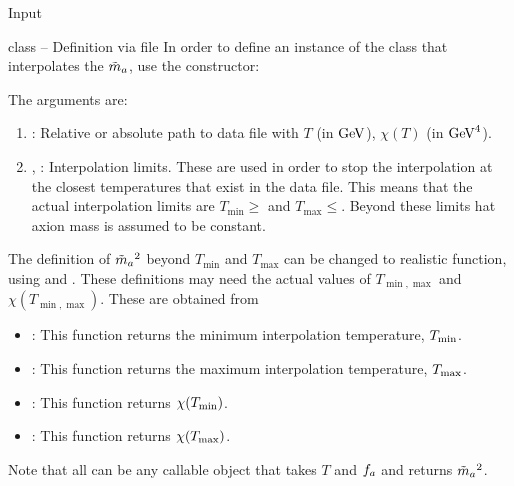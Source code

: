 \documentclass[10pt,utf8,compress,xcolor=dvipsnames]{beamer}
\begin{document}

\begin{frame}[noframenumbering]
	\begin{center}
		{\color{yellow} \Huge \CPP  Input}
	\end{center}
\end{frame}
%


\begin{frame}{ class -- Definition via file}
	\fontB
	In order to define an instance of the  class that interpolates the $\tilde m_{a}{}$, use the constructor:
	\lstset{language = c++}
	
	The arguments are:
	\begin{enumerate}
		\item {}: Relative or absolute path to data file with $T$ (in ${\rm GeV}$), $\chi(T)$ (in ${\rm GeV}^4$).
		\item {}, : Interpolation limits. These are used in order to stop the interpolation at the closest temperatures that exist in the data file. This means that the actual interpolation limits are $T_{\min}\geq$ and $T_{\max}\leq$. Beyond these limits hat axion mass is assumed to be constant.
	\end{enumerate}
	
	The definition of $\tilde m_{a}{}^2$ beyond $T_{\min}$ and $T_{\max}$ can be changed to realistic function, using   and . These definitions may need the actual values of   $T_{\min,\max}$ and $\chi(T_{\min,\max})$. These are obtained from
	\begin{itemize}
		\item {}: This function returns the minimum interpolation temperature, $T_{\rm min}$. 
		\item {}: This function returns the maximum interpolation temperature, $T_{\rm max}$.
		\item {}: This function returns $\chi(T_{\rm min})$.
		\item {}: This function returns $\chi(T_{\rm max})$.
	\end{itemize}
	
	Note that all  can be any callable object that takes $T$ and $f_{a}{}$ and returns $\tilde m_{a}{}^2$.
	
\end{frame}
\end{document}

